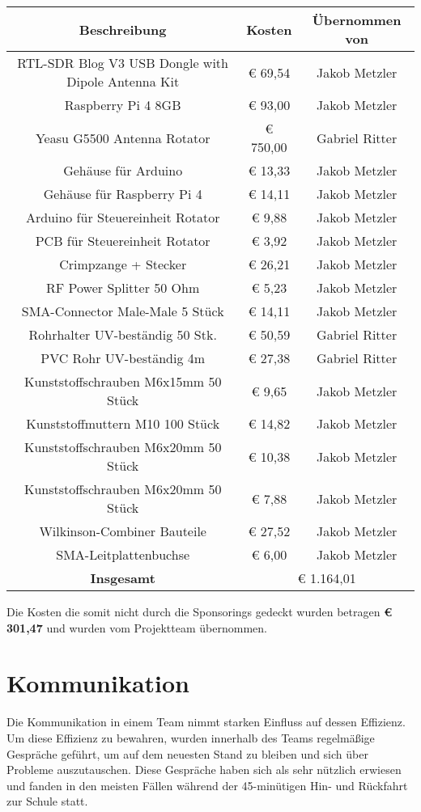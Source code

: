 \begin{tabular}{|c|c|c|}
	\hline
	\textbf{Beschreibung} & \textbf{Kosten} & \textbf{Übernommen von} \\
	\hline
	RTL-SDR Blog V3 USB Dongle with Dipole Antenna Kit &  € 69,54  & Jakob Metzler \\
	\hline
	Raspberry Pi 4 8GB &  € 93,00  & Jakob Metzler \\
	\hline
	Yeasu G5500 Antenna Rotator &  € 750,00  & Gabriel Ritter \\
	\hline
	Gehäuse für Arduino &  € 13,33  & Jakob Metzler \\
	\hline
	Gehäuse für Raspberry Pi 4 &  € 14,11  & Jakob Metzler \\
	\hline
	Arduino für Steuereinheit Rotator &  € 9,88  & Jakob Metzler \\
	\hline
	PCB für Steuereinheit Rotator &  € 3,92  & Jakob Metzler \\
	\hline
	Crimpzange + Stecker &  € 26,21  & Jakob Metzler \\
	\hline
	RF Power Splitter 50 Ohm &  € 5,23  & Jakob Metzler \\
	\hline
	SMA-Connector Male-Male 5 Stück &  € 14,11  & Jakob Metzler \\
	\hline
	Rohrhalter UV-beständig 50 Stk. &  € 50,59  & Gabriel Ritter \\
	\hline
	PVC Rohr UV-beständig 4m &  € 27,38  & Gabriel Ritter \\
	\hline
	Kunststoffschrauben M6x15mm 50 Stück &  € 9,65  & Jakob Metzler \\
	\hline
	Kunststoffmuttern M10 100 Stück &  € 14,82  & Jakob Metzler \\
	\hline
	Kunststoffschrauben M6x20mm 50 Stück &  € 10,38  & Jakob Metzler \\
	\hline
	Kunststoffschrauben M6x20mm 50 Stück &  € 7,88  & Jakob Metzler \\
	\hline
	Wilkinson-Combiner Bauteile &  € 27,52  & Jakob Metzler \\
	\hline
	SMA-Leitplattenbuchse &  € 6,00  & Jakob Metzler \\
	\hhline{|===|}
	\textbf{Insgesamt} & \multicolumn{2}{c|}{€ 1.164,01} \\
	\hline
\end{tabular}

Die Kosten die somit nicht durch die Sponsorings gedeckt wurden betragen \textbf{€ 301,47} und wurden vom Projektteam übernommen. 

\section{Kommunikation}
Die Kommunikation in einem Team nimmt starken Einfluss auf dessen Effizienz. Um diese Effizienz zu bewahren, wurden innerhalb des Teams regelmäßige Gespräche geführt, um auf dem neuesten Stand zu bleiben und sich über Probleme auszutauschen. Diese Gespräche haben sich als sehr nützlich erwiesen und fanden in den meisten Fällen während der 45-minütigen Hin- und Rückfahrt zur Schule statt. 